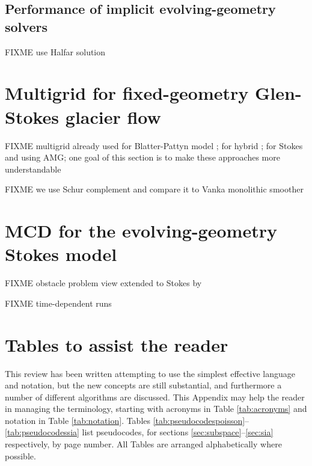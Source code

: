 \documentclass[letterpaper,final,12pt,reqno]{amsart}
\theoremstyle{claim}
\numberwithin{equation}{section}
\numberwithin{figure}{section}
\numberwithin{table}{section}
\numberwithin{theorem}{section}
\begin{document}
\subsection{Performance of implicit evolving-geometry solvers} \label{subsec:siaimplicit}  FIXME use Halfar solution


\section{Multigrid for fixed-geometry Glen-Stokes glacier flow} \label{sec:stokes}

FIXME multigrid already used for Blatter-Pattyn model \cite{BrownSmithAhmadia2013}; for hybrid \cite{Jouvetetal2013,JouvetGraeser2013}; for Stokes \cite{IsaacStadlerGhattas2015} and \cite{Tuminaroetal2016} using AMG; one goal of this section is to make these approaches more understandable

FIXME we use Schur complement \cite{Bueler2021,Elmanetal2014} and compare it to Vanka monolithic smoother \cite{Farrelletal2019}


\section{MCD for the evolving-geometry Stokes model} \label{sec:evolvingstokes}

FIXME obstacle problem view extended to Stokes by \cite{WirbelJarosch2020}

FIXME time-dependent runs


\small

\bigskip



\normalsize

\appendix

\section{Tables to assist the reader}

This review has been written attempting to use the simplest effective language and notation, but the new concepts are still substantial, and furthermore a number of different algorithms are discussed.  This Appendix may help the reader in managing the terminology, starting with acronyms in Table \ref{tab:acronyms} and notation in Table \ref{tab:notation}.  Tables \ref{tab:pseudocodespoisson}--\ref{tab:pseudocodessia} list pseudocodes, for sections \ref{sec:subspace}--\ref{sec:sia} respectively, by page number.  All Tables are arranged alphabetically where possible.
\end{document}
